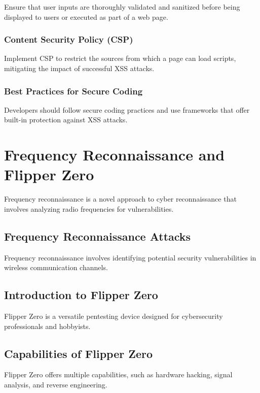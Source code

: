 \documentclass{article}
\begin{document}
Ensure that user inputs are thoroughly validated and sanitized before being displayed to users or executed as part of a web page.

\subsubsection{Content Security Policy (CSP)}

Implement CSP to restrict the sources from which a page can load scripts, mitigating the impact of successful XSS attacks.

\subsubsection{Best Practices for Secure Coding}

Developers should follow secure coding practices and use frameworks that offer built-in protection against XSS attacks.

\section{Frequency Reconnaissance and Flipper Zero}

Frequency reconnaissance is a novel approach to cyber reconnaissance that involves analyzing radio frequencies for vulnerabilities.

\subsection{Frequency Reconnaissance Attacks}

Frequency reconnaissance involves identifying potential security vulnerabilities in wireless communication channels.

\subsection{Introduction to Flipper Zero}

Flipper Zero is a versatile pentesting device designed for cybersecurity professionals and hobbyists.

\subsection{Capabilities of Flipper Zero}

Flipper Zero offers multiple capabilities, such as hardware hacking, signal analysis, and reverse engineering.
\end{document}

